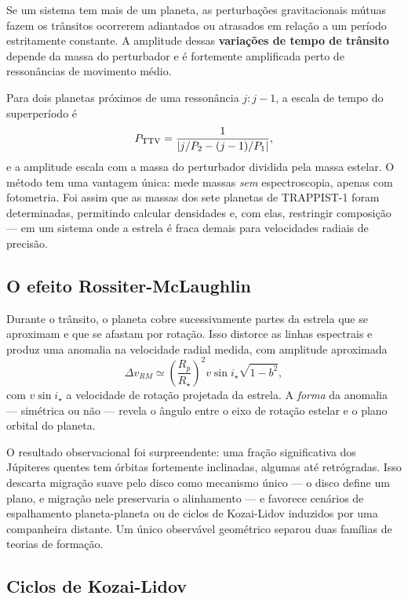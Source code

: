 \documentclass[11pt,a4paper]{article}
\begin{document}
Se um sistema tem mais de um planeta, as perturbações gravitacionais mútuas fazem os trânsitos ocorrerem adiantados ou atrasados em relação a um período estritamente constante. A amplitude dessas \textbf{variações de tempo de trânsito} depende da massa do perturbador e é fortemente amplificada perto de ressonâncias de movimento médio.

Para dois planetas próximos de uma ressonância $j:j-1$, a escala de tempo do superperíodo é
\[
P_{\rm TTV}=\frac{1}{\left|j/P_2-(j-1)/P_1\right|},
\]
e a amplitude escala com a massa do perturbador dividida pela massa estelar. O método tem uma vantagem única: mede massas \emph{sem} espectroscopia, apenas com fotometria. Foi assim que as massas dos sete planetas de TRAPPIST-1 foram determinadas, permitindo calcular densidades e, com elas, restringir composição --- em um sistema onde a estrela é fraca demais para velocidades radiais de precisão.

\subsection*{O efeito Rossiter-McLaughlin}

Durante o trânsito, o planeta cobre sucessivamente partes da estrela que se aproximam e que se afastam por rotação. Isso distorce as linhas espectrais e produz uma anomalia na velocidade radial medida, com amplitude aproximada
\[
\Delta v_{RM}\simeq\left(\frac{R_p}{R_\star}\right)^{2}v\sin i_\star\sqrt{1-b^{2}},
\]
com $v\sin i_\star$ a velocidade de rotação projetada da estrela. A \emph{forma} da anomalia --- simétrica ou não --- revela o ângulo entre o eixo de rotação estelar e o plano orbital do planeta.

O resultado observacional foi surpreendente: uma fração significativa dos Júpiteres quentes tem órbitas fortemente inclinadas, algumas até retrógradas. Isso descarta migração suave pelo disco como mecanismo único --- o disco define um plano, e migração nele preservaria o alinhamento --- e favorece cenários de espalhamento planeta-planeta ou de ciclos de Kozai-Lidov induzidos por uma companheira distante. Um único observável geométrico separou duas famílias de teorias de formação.

\subsection*{Ciclos de Kozai-Lidov}
\end{document}
